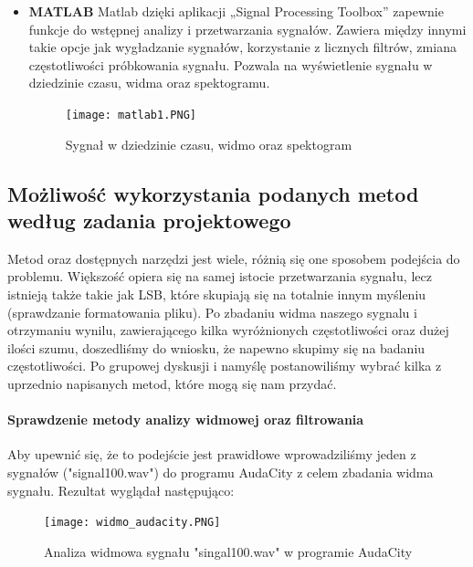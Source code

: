 \documentclass[a4paper,titleauthor]{mwart}
\begin{document}
\begin{itemize}
		\item \textbf{MATLAB} \newline\newline
		Matlab dzięki aplikacji „Signal Processing Toolbox” zapewnie funkcje do wstępnej analizy i przetwarzania sygnałów. Zawiera między innymi takie opcje jak wygładzanie sygnałów, korzystanie z licznych filtrów, zmiana częstotliwości próbkowania sygnału. \newline
		Pozwala na wyświetlenie sygnału w dziedzinie czasu, widma oraz spektogramu.\newline
		
		\begin{figure}[h]
			\centering
			\texttt{[image: matlab1.PNG]}
			\caption{Sygnał w dziedzinie czasu, widmo oraz spektogram}
		\end{figure}
		
	\end{itemize}
	
	\subsection{Możliwość wykorzystania podanych metod według zadania projektowego}
	
	Metod oraz dostępnych narzędzi jest wiele, różnią się one sposobem podejścia do problemu. Większość opiera się na samej istocie przetwarzania sygnału, lecz istnieją także takie jak LSB, które skupiają się na totalnie innym myśleniu (sprawdzanie formatowania pliku). Po zbadaniu widma naszego sygnalu i otrzymaniu wynilu, zawierającego kilka wyróżnionych częstotliwości oraz dużej ilości szumu, doszedliśmy do wniosku, że napewno skupimy się na badaniu częstotliwości. Po grupowej dyskusji i namyślę postanowiliśmy wybrać kilka z uprzednio napisanych metod, które mogą się nam przydać.
	
	\paragraph{Sprawdzenie metody analizy widmowej oraz filtrowania}
	Aby upewnić się, że to podejście jest prawidłowe wprowadziliśmy jeden z sygnałów ("signal100.wav") do programu AudaCity z celem zbadania widma sygnału. Rezultat wyglądał następująco:
	
	\begin{figure}[h]
		\centering
		\texttt{[image: widmo\_audacity.PNG]}
		\caption{Analiza widmowa sygnału "singal100.wav" w programie AudaCity}
	\end{figure}
	
\end{document}
